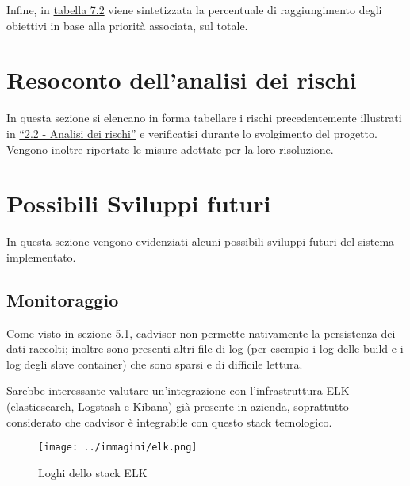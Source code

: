 

Infine, in \hyperref[tab:resume]{tabella 7.2} viene sintetizzata la percentuale di raggiungimento degli obiettivi in base alla priorità associata, sul totale.


\newpage
\section{Resoconto dell'analisi dei rischi}

In questa sezione si elencano in forma tabellare i rischi precedentemente illustrati in {\hyperref[tab:rischi]{``2.2 - Analisi dei rischi''}} e verificatisi durante lo svolgimento del progetto. Vengono inoltre riportate le misure adottate per la loro risoluzione.



\newpage

\section{Possibili Sviluppi futuri}
In questa sezione vengono evidenziati alcuni possibili sviluppi futuri del sistema implementato.\\

\subsection{Monitoraggio}
Come visto in \hyperref[sec:monitoring]{sezione 5.1}, cadvisor non permette nativamente la persistenza dei dati raccolti; inoltre sono presenti altri file di log (per esempio i log delle \gls{build} e i log degli \gls{slave} container) che sono sparsi e di difficile lettura. 

Sarebbe interessante valutare un'integrazione con l'infrastruttura ELK (elasticsearch, Logstash e Kibana) già presente in azienda, soprattutto considerato che cadvisor è integrabile con questo stack tecnologico.

\begin{figure}[H]
    \capstart
    \centering
    \texttt{[image: ../immagini/elk.png]}
    \caption{Loghi dello stack ELK}
\end{figure}

